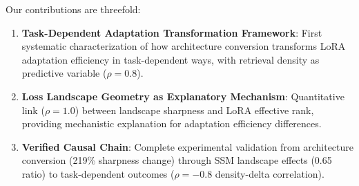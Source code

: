 Our contributions are threefold:

\begin{enumerate}
    \item \textbf{Task-Dependent Adaptation Transformation Framework}: First systematic characterization of how architecture conversion transforms LoRA adaptation efficiency in task-dependent ways, with retrieval density as predictive variable ($\rho=0.8$).

    \item \textbf{Loss Landscape Geometry as Explanatory Mechanism}: Quantitative link ($\rho=1.0$) between landscape sharpness and LoRA effective rank, providing mechanistic explanation for adaptation efficiency differences.

    \item \textbf{Verified Causal Chain}: Complete experimental validation from architecture conversion (219\% sharpness change) through SSM landscape effects (0.65 ratio) to task-dependent outcomes ($\rho=-0.8$ density-delta correlation).
\end{enumerate}
